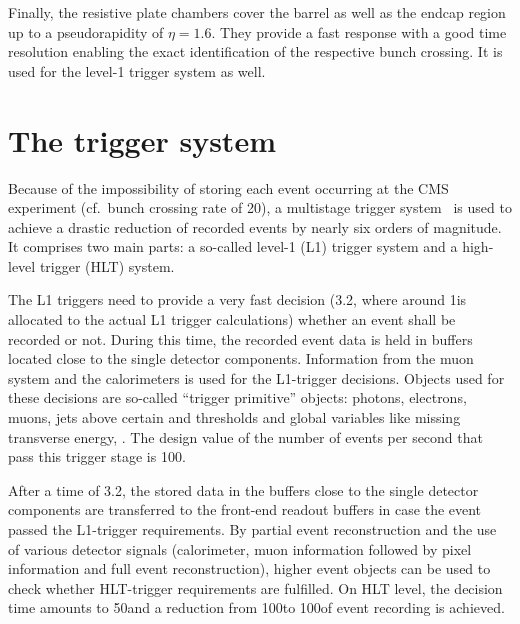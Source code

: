 Finally, the resistive plate chambers cover the barrel as well as the endcap region up to a pseudorapidity of $\eta=1.6$. 
They provide a fast response with a good time resolution enabling the exact identification of the respective bunch crossing.
It is used for the level-1 trigger system as well.
\section{The trigger system}
\label{sec:TriggerSystem}
Because of the impossibility of storing each event occurring at the CMS experiment (cf.~bunch crossing rate of 20\mhz), a multistage trigger system~\cite{bib:CMS:TDR_2006} is used to achieve a drastic reduction of recorded events by nearly six orders of magnitude.
It comprises two main parts: a so-called level-1 (L1) trigger system and a high-level trigger (HLT) system.

The L1 triggers need to provide a very fast decision (3.2\mus, where around 1\mus is allocated to the actual L1 trigger calculations) whether an event shall be recorded or not.
During this time, the recorded event data is held in buffers located close to the single detector components.
Information from the muon system and the calorimeters is used for the L1-trigger decisions.
Objects used for these decisions are so-called ``trigger primitive'' objects: photons, electrons, muons, jets above certain \et and \pt thresholds and global variables like missing transverse energy, \met. 
The design value of the number of events per second that pass this trigger stage is 100\khz.

After a time of 3.2\mus, the stored data in the buffers close to the single detector components are transferred to the front-end readout buffers in case the event passed the L1-trigger requirements.
By partial event reconstruction and the use of various detector signals (calorimeter, muon information followed by pixel information and full event reconstruction), higher event objects can be used to check whether HLT-trigger requirements are fulfilled.
On HLT level, the decision time amounts to 50\ms and a reduction from 100\khz to 100\hz of event recording is achieved.

\FloatBarrier
